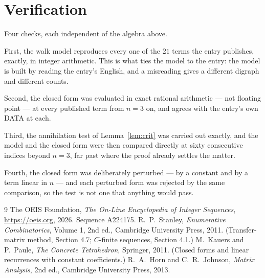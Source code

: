 \documentclass[11pt,a4paper]{article}
\theoremstyle{plain}
\theoremstyle{definition}
\begin{document}
\section{Verification}

Four checks, each independent of the algebra above.

First, the walk model reproduces every one of the $21$ terms the entry publishes,
exactly, in integer arithmetic. This is what ties the model to the entry: the model is built
by reading the entry's English, and a misreading gives a different digraph and different
counts.

Second, the closed form was evaluated in exact rational arithmetic --- not floating point ---
at every published term from $n=3$ on, and agrees with the entry's own DATA at each.

Third, the annihilation test of Lemma~\ref{lem:crit} was carried out exactly, and the model
and the closed form were then compared directly at sixty consecutive indices beyond
$n=3$, far past where the proof already settles the matter.

Fourth, the closed form was deliberately perturbed --- by a constant and by a term linear in
$n$ --- and each perturbed form was rejected by the same comparison, so the test is not one
that anything would pass.

\begin{thebibliography}{9}
 The OEIS Foundation, \emph{The On-Line Encyclopedia of Integer
Sequences}, \url{https://oeis.org}, 2026. Sequence A224175.
 R.~P.~Stanley, \emph{Enumerative Combinatorics}, Volume 1, 2nd ed.,
Cambridge University Press, 2011. (Transfer-matrix method, Section 4.7; $C$-finite sequences,
Section 4.1.)
 M.~Kauers and P.~Paule, \emph{The Concrete Tetrahedron}, Springer, 2011.
(Closed forms and linear recurrences with constant coefficients.)
 R.~A.~Horn and C.~R.~Johnson, \emph{Matrix Analysis}, 2nd ed., Cambridge
University Press, 2013.
\end{thebibliography}
\end{document}
